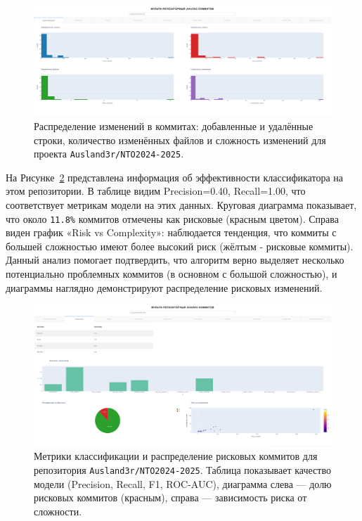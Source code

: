  \begin{figure}[H]
	\centering
	\includegraphics[width=\textwidth]{my_folder/images/first_page.png}
	\caption{Распределение изменений в коммитах: добавленные и удалённые строки, количество изменённых файлов и сложность изменений для проекта \texttt{Ausland3r/NTO2024-2025}.}
	\label{fig:commit_stats}
\end{figure}
На Рисунке~\ref{fig:risk_analysis} представлена информация об эффективности классификатора на этом репозитории. В таблице видим Precision=0.40, Recall=1.00, что соответствует метрикам модели на этих данных. Круговая диаграмма показывает, что около \verb|11.8%| коммитов отмечены как рисковые (красным цветом). Справа виден график «Risk vs Complexity»: наблюдается тенденция, что коммиты с большей сложностью имеют более высокий риск (жёлтым - рисковые коммиты). Данный анализ помогает подтвердить, что алгоритм верно выделяет несколько потенциально проблемных коммитов (в основном с большой сложностью), и диаграммы наглядно демонстрируют распределение рисковых изменений.

\begin{figure}[H]
	\centering
	\includegraphics[width=\textwidth]{my_folder/images/second_page.png}
	\caption{Метрики классификации и распределение рисковых коммитов для репозитория \texttt{Ausland3r/NTO2024-2025}. Таблица показывает качество модели (Precision, Recall, F1, ROC-AUC), диаграмма слева — долю рисковых коммитов (красным), справа — зависимость риска от сложности.}
	\label{fig:risk_analysis}
\end{figure}

